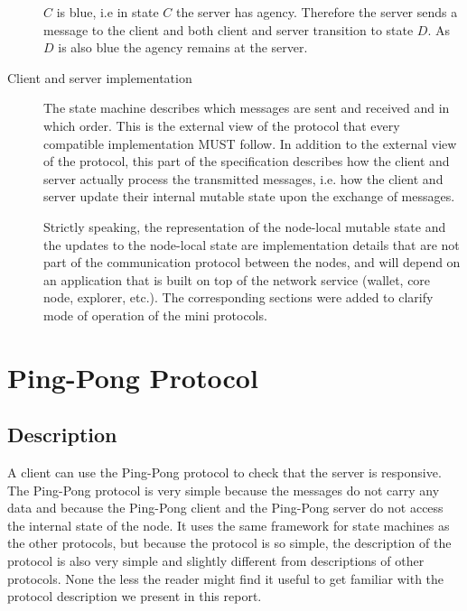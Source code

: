 \documentclass{report}
\newcommand{\hsref}[1]{}
\newcommand{\msg}[1]{\texttt{#1}}
\theoremstyle{definition}{
  \newtheorem{lemma}{Lemma}[section] %
  \newtheorem{definition}[lemma]{Definition}
}
\theoremstyle{theorem}{
  \newtheorem{invariant}[lemma]{Invariant}
  \newtheorem{proofobligation}[lemma]{Proof Obligation}
}
\numberwithin{equation}{lemma}
\begin{document}
\begin{description}
      $C$ is blue, i.e in state $C$ the server has agency.
      Therefore the server sends a message to the client and
      both client and server transition to state $D$.
      As $D$ is also blue the agency remains at the server.

\item[Client and server implementation]
  The state machine describes which messages are sent and received and in which order.
  This is the external view of the protocol that every compatible implementation MUST follow.
  In addition to the external view of the protocol, this part of the specification describes
  how the client and server actually process the transmitted messages,
  i.e. how the client and server update their internal mutable state
  upon the exchange of messages.

  Strictly speaking, the representation of the node-local mutable state
  and the updates to the node-local state are implementation details that are
  not part of the communication protocol between the nodes,  and will
  depend on an application that is built on top of the network service
  (wallet, core node, explorer, etc.).
  The corresponding sections were added to clarify mode of operation of the
  mini protocols.

\end{description}

\section{Ping-Pong Protocol}
\label{ping-pong-protocol}
\hsref{typed-protocols/src/Network/TypedProtocol/PingPong/Type.hs}
\newcommand{\Ping}{\msg{Ping}}
\newcommand{\Pong}{\msg{Pong}}

\subsection{Description}
A client can use the Ping-Pong protocol to check that the server is responsive.
The Ping-Pong protocol is very simple because the messages do not carry any data and
because the Ping-Pong client and the Ping-Pong server do not access the internal state of the node.
It uses the same framework for state machines as the other protocols,
but because the protocol is so simple,
the description of the protocol is also very simple and slightly
different from descriptions of other protocols.
None the less the reader might
find it useful to get familiar with the protocol description we present in this report.
\end{document}
